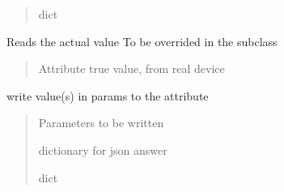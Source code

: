 \documentclass[letterpaper,10pt,english]{sphinxmanual}
\begin{document}
\begin{fulllineitems}
\begin{fulllineitems}
\begin{quote}
\begin{description}
\sphinxAtStartPar
dict

\end{description}\end{quote}

\end{fulllineitems}


\begin{fulllineitems}
\label{\detokenize{webserverdocs:HardwareBaseClass.HardwareAttribute.read_value}}
\pysigstartsignatures
{}
\pysigstopsignatures
\sphinxAtStartPar
Reads the actual value
To be overrided in the subclass
\begin{quote}\begin{description}
\sphinxAtStartPar
Attribute true value, from real device

\end{description}\end{quote}

\end{fulllineitems}


\begin{fulllineitems}
\label{\detokenize{webserverdocs:HardwareBaseClass.HardwareAttribute.write}}
\pysigstartsignatures
{}
\pysigstopsignatures
\sphinxAtStartPar
write value(s) in params to the attribute
\begin{quote}\begin{description}
\sphinxAtStartPar
{} \textendash{} Parameters to be written

\sphinxAtStartPar
dictionary for json answer

\sphinxAtStartPar
dict

\end{description}\end{quote}

\end{fulllineitems}


\end{fulllineitems}
\end{document}
